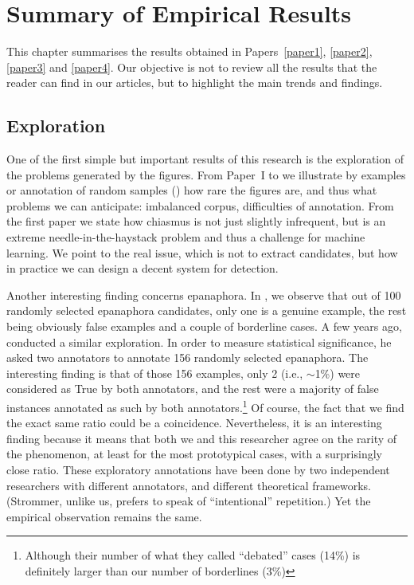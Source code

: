 \chapter{\label{chap5}Summary of Empirical Results}%
This chapter summarises the results obtained in Papers~\ref{paper1}, \ref{paper2}, \ref{paper3} and \ref{paper4}. Our objective is not to review all the results that the reader can find in our articles, but to highlight the main trends and findings.
\section{Exploration}
One of the first simple but important results of this research is the exploration of the problems generated by the figures. From Paper~I to  we illustrate by examples or annotation of random samples () how rare the figures are, and thus what problems we can anticipate: imbalanced corpus, difficulties of annotation. From the first paper we state how chiasmus is not just slightly infrequent, but is an extreme needle-in-the-haystack problem and thus a challenge for machine learning.  We point to the real issue, which is not to extract candidates, but how in practice we can design a decent system for detection.

Another interesting finding concerns epanaphora. In , we observe that out of 100 randomly selected epanaphora candidates, only one is a genuine example, the rest being obviously false examples and a couple of borderline cases. A few years ago, \citet{Strommer2011} conducted a similar exploration. In order to measure statistical significance, he asked two annotators to annotate 156 randomly selected epanaphora. The interesting finding is that of those 156 examples, only 2 (i.e., $\sim$1\%) were considered as True by both annotators, and the rest were a majority of false instances annotated as such by both annotators.\footnote{Although their number of what they called ``debated'' cases (14\%) is definitely larger than our number of borderlines (3\%)} Of course, the fact that we find the exact same ratio could be a coincidence. Nevertheless, it is an interesting finding because it means that both we and this researcher agree on the rarity of the phenomenon, at least for the most prototypical cases, with a surprisingly close ratio. These exploratory annotations have been done by two independent researchers with different annotators, and different theoretical frameworks. (Strommer, unlike us, prefers to speak of ``intentional'' repetition.) Yet the empirical observation remains the same.


